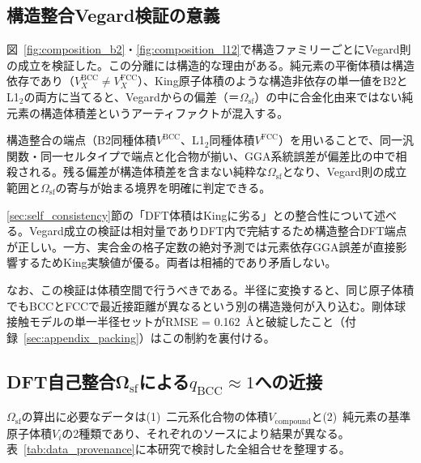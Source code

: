 \documentclass[5p,10pt]{elsarticle}
\begin{document}
\subsection{構造整合Vegard検証の意義}
\label{sec:vegard_structure}

図~\ref{fig:composition_b2}・\ref{fig:composition_l12}で構造ファミリーごとにVegard則の成立を検証した。この分離には構造的な理由がある。純元素の平衡体積は構造依存であり（$V_X^\text{BCC} \neq V_X^\text{FCC}$）、King原子体積のような構造非依存の単一値をB2とL1$_2$の両方に当てると、Vegardからの偏差（＝$\Omega_\text{sf}$）の中に合金化由来ではない純元素の構造体積差というアーティファクトが混入する。

構造整合の端点（B2同種体積$V^\text{BCC}$、L1$_2$同種体積$V^\text{FCC}$）を用いることで、同一汎関数・同一セルタイプで端点と化合物が揃い、GGA系統誤差が偏差比の中で相殺される。残る偏差が構造体積差を含まない純粋な$\Omega_\text{sf}$となり、Vegard則の成立範囲と$\Omega_\text{sf}$の寄与が始まる境界を明確に判定できる。

\ref{sec:self_consistency}節の「DFT体積はKingに劣る」との整合性について述べる。Vegard成立の検証は相対量でありDFT内で完結するため構造整合DFT端点が正しい。一方、実合金の格子定数の絶対予測では元素依存GGA誤差が直接影響するためKing実験値が優る。両者は相補的であり矛盾しない。

なお、この検証は体積空間で行うべきである。半径に変換すると、同じ原子体積でもBCCとFCCで最近接距離が異なるという別の構造幾何が入り込む。剛体球接触モデルの単一半径セットがRMSE = 0.162~\AA{}と破綻したこと（付録~\ref{sec:appendix_packing}）はこの制約を裏付ける。


\subsection{DFT自己整合Ω$_\text{sf}$による$q_\text{BCC} \approx 1$への近接}
\label{sec:dft_self_consistent}

$\Omega_\text{sf}$の算出に必要なデータは(1)~二元系化合物の体積$V_\text{compound}$と(2)~純元素の基準原子体積$V_i$の2種類であり、それぞれのソースにより結果が異なる。表~\ref{tab:data_provenance}に本研究で検討した全組合せを整理する。
\end{document}
